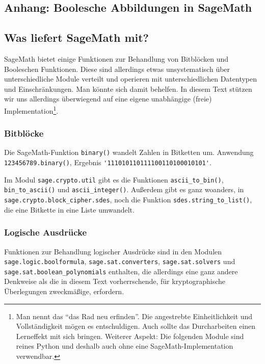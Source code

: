 \begin{refsegment}
\newpage
\section{Anhang: Boolesche Abbildungen in SageMath}\label{a-bool-sage}
\subsection{Was liefert SageMath mit?}

SageMath bietet einige Funktionen zur Behandlung von Bitblöcken
und Booleschen Funktionen.
Diese sind allerdings etwas unsystematisch über unterschiedliche Module
verteilt und operieren mit unterschiedlichen Datentypen und Einschränkungen.
Man könnte sich damit behelfen. In diesem Text stützen wir uns allerdings
überwiegend auf eine eigene unabhängige (freie) Implementation\footnote{%
   Man nennt das "`das Rad neu erfinden"'. Die angestrebte Einheitlichkeit
   und Vollständigkeit mögen es entschuldigen. Auch sollte das Durcharbeiten
   einen Lerneffekt mit sich bringen. Weiterer Aspekt:
   Die folgenden Module sind reines Python und deshalb auch ohne eine
   SageMath-Implementation verwendbar.
}.

\subsubsection*{Bitblöcke}

Die SageMath-Funktion \verb:binary(): wandelt Zahlen in
Bitketten um. Anwendung \verb:123456789.binary():,
Ergebnis \verb:'111010110111100110100010101':.

Im Modul \verb:sage.crypto.util: gibt es die Funktionen \verb:ascii_to_bin():,
\verb:bin_to_ascii(): und \verb:ascii_integer():. Außerdem gibt es ganz
woanders, in \verb:sage.crypto.block_cipher.sdes:, noch die Funktion
\verb:sdes.string_to_list():, die eine Bitkette in eine Liste umwandelt.

\subsubsection*{Logische Ausdrücke}

Funktionen zur Behandlung logischer
Ausdrücke
sind in den Modulen
\verb:sage.logic.boolformula:,
\verb:sage.sat.converters:,
\verb:sage.sat.solvers: und
\verb:sage.sat.boolean_polynomials:
enthalten, die allerdings eine ganz andere Denkweise als die in
diesem Text vorherrschende, für kryptographische Überlegungen
zweckmäßige, erfordern.


\end{refsegment}
